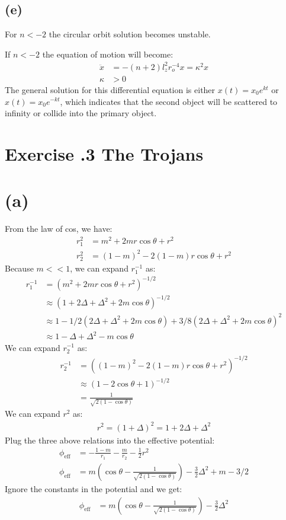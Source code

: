 \documentclass[a4paper,12pt]{article}
\begin{document}
\subsection*{(e)}
For $n<-2$ the circular orbit solution becomes unstable. 

If $n<-2$ the equation of motion will become:
\begin{align*}
    \ddot{x} &= -(n+2)l_z^2 r_o^{-4} x = \kappa^2 x\\
    \kappa &> 0
\end{align*}
The general solution for this differential equation is either $x(t) = x_0 e^{kt}$ 
or $x(t) = x_0 e^{-kt}$, which indicates that the second object will be scattered to 
infinity or collide into the primary object.  

\section*{\textbf{Exercise \uppercase\expandafter{}.3 The Trojans}}
\section*{(a)}
From the law of cos, we have:
\begin{align*}
    r_1^2 &= m^2 + 2mr\cos \theta + r^2 \\
    r_2^2 &= (1-m)^2 - 2(1-m)r \cos \theta + r^2
\end{align*}
Because $m<<1$, we can expand $r_1^{-1}$ as:
\begin{align*}
    r_1^{-1} &= (m^2 + 2mr\cos \theta + r^2)^{-1/2} \\
            &\approx (1 + 2\Delta + \Delta^2 + 2m\cos \theta)^{-1/2} \\
            &\approx 1 - 1/2 (2\Delta + \Delta^2 + 2m\cos \theta) + 3/8 (2\Delta + \Delta^2 + 2m\cos \theta)^2 \\
            &\approx 1 - \Delta + \Delta^2 -m \cos \theta
\end{align*}
We can expand $r_2^{-1}$ as:
\begin{align*}
    r_2^{-1} &= ((1-m)^2 - 2(1-m)r \cos \theta + r^2)^{-1/2} \\
            &\approx (1 - 2 \cos \theta + 1)^{-1/2} \\
            &= \frac{1}{\sqrt{2(1- \cos \theta)}}
\end{align*}
We can expand $r^2$ as:
\begin{align*}
    r^2 = (1+\Delta)^2 = 1 + 2\Delta + \Delta^2
\end{align*}
Plug the three above relations into the effective potential:
\begin{align*}
    \phi_{\text{eff}} &= -\frac{1-m}{r_1} - \frac{m}{r_2} - \frac{1}{2}r^2 \\
    \phi_{\text{eff}} &= m(\cos \theta - \frac{1}{\sqrt{2(1- \cos \theta)}}) - \frac{3}{2}\Delta^2 +m - 3/2
\end{align*}
Ignore the constants in the potential and we get:
\begin{align*}
    \phi_{\text{eff}} &= m(\cos \theta - \frac{1}{\sqrt{2(1- \cos \theta)}}) - \frac{3}{2}\Delta^2
\end{align*}
\end{document}
